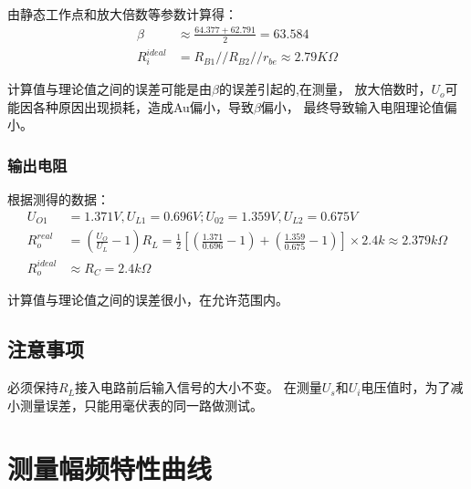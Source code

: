 \documentclass[a4paper]{article}
\begin{document}
    {{由静态工作点和放大倍数等参数计算得：}}
    \begin{equation}
        \begin{aligned}
            \beta&\approx\frac{64.377+62.791}{2}=63.584\\
            R_i^{ideal}&=R_{B1}//R_{B2}//r_{be}\approx2.79K\Omega
        \end{aligned}\label{eq:equation7}
    \end{equation}

    {{计算值与理论值之间的误差可能是由$\beta$的误差引起的,在测量，
    放大倍数时，$U_o$可能因各种原因出现损耗，造成Au偏小，导致$\beta$偏小，
    最终导致输入电阻理论值偏小。}}

    \subsubsection{输出电阻}
    {{根据测得的数据：}}
    \begin{equation}
        \begin{aligned}
            U_{O1}&=1.371V,U_{L1}=0.696V;U_{02}=1.359V,U_{L2}=0.675V\\
            R_o^{real}&=(\frac{U_O}{U_L}-1)R_L=\frac{1}{2}[(\frac{1.371}{0.696}-1)+(\frac{1.359}{0.675}-1)]\times2.4k\approx2.379k\Omega\\
            R_o^{ideal}&\approx R_C=2.4k\Omega
        \end{aligned}\label{eq:equation8}
    \end{equation}

    {{计算值与理论值之间的误差很小，在允许范围内。}}

    \subsection{注意事项}\label{subsec:12}
    {{必须保持$R_L$接入电路前后输入信号的大小不变。}}
    {{在测量$U_s$和$U_i$电压值时，为了减小测量误差，只能用毫伏表的同一路做测试。}}
    \vspace{1cm}


    \section{测量幅频特性曲线}\label{sec:6}
\end{document}
